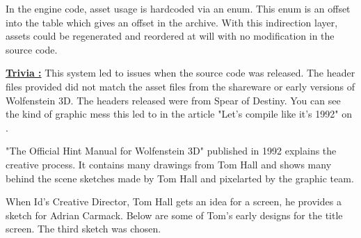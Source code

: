 \documentclass[book.tex]{subfiles}
\begin{document}
 In the engine code, asset usage is hardcoded via an enum. This enum is an offset into the 
  table which gives an offset in the  archive. With this indirection layer, assets could be regenerated and reordered at will with no modification in the source code.\\
 \par
 \begin{minipage}{\textwidth}
 \par
 \end{minipage}


 
\pagebreak
\textbf{\underline{Trivia :}} This system led to issues when the source code was released. The  header files provided did not match the asset files from the shareware or early versions of Wolfenstein 3D. The headers released were from Spear of Destiny. You can see the kind of graphic mess this led to in the article "Let's compile like it's 1992" on .\\




\begin{minipage}{0.7\textwidth}
"The Official Hint Manual for Wolfenstein 3D" published in 1992 explains the creative process. It contains many drawings from Tom Hall and shows many behind the scene sketches made by Tom Hall and pixelarted by the graphic team.\\
\par
 \begin{fancyquotes}
When Id's Creative Director, Tom Hall gets an idea for a screen, he provides a sketch for Adrian Carmack. Below are some of Tom's early designs for the title screen. The third sketch was chosen.\\
\end{fancyquotes}
\end{minipage}
\begin{minipage}{0.3\textwidth}
\begin{flushright}
\end{flushright}
\end{minipage}

\noindent
   \begin{figure}[H]
\centering
 \par
 \end{figure}
 \par
   
\end{document}
